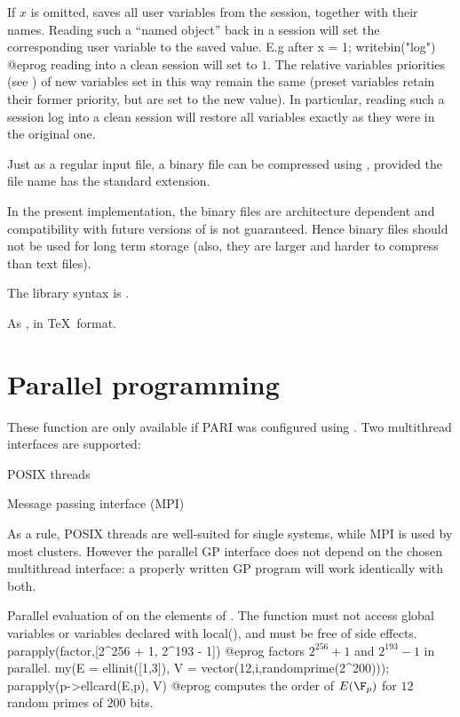 {If $x$ is omitted, saves all user variables from the session, together with
their names. Reading such a ``named object'' back in a  session will set
the corresponding user variable to the saved value. E.g after
\bprog
x = 1; writebin("log")
@eprog\noindent
reading  into a clean session will set  to $1$.
The relative variables priorities (see ) of new variables
set in this way remain the same (preset variables retain their former
priority, but are set to the new value). In particular, reading such a
session log into a clean session will restore all variables exactly as they
were in the original one.

Just as a regular input file, a binary file can be compressed
using , provided the file name has the standard 
extension.

In the present implementation, the binary files are architecture dependent
and compatibility with future versions of  is not guaranteed. Hence
binary files should not be used for long term storage (also, they are
larger and harder to compress than text files).

The library syntax is .

\label{se:writetex}
As , in \TeX\ format.

\section{Parallel programming}

These function are only available if PARI was configured using
. Two multithread interfaces are supported:

\item POSIX threads

\item Message passing interface (MPI)

As a rule, POSIX threads are well-suited for single systems, while MPI is used
by most clusters. However the parallel GP interface does not depend on the
chosen multithread interface: a properly written GP program will work
identically with both.


\label{se:parapply}
Parallel evaluation of  on the elements of .
The function  must not access global variables or variables
declared with local(), and must be free of side effects.
\bprog
parapply(factor,[2^256 + 1, 2^193 - 1])
@eprog
factors $2^{256} + 1$ and $2^{193} - 1$ in parallel.
\bprog
{
  my(E = ellinit([1,3]), V = vector(12,i,randomprime(2^200)));
  parapply(p->ellcard(E,p), V)
}
@eprog
computes the order of $E(\F_p)$ for $12$ random primes of $200$ bits.

}
